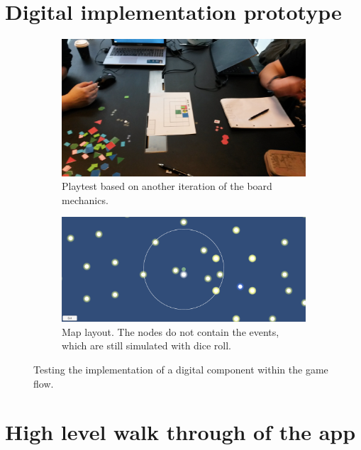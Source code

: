 \documentclass[a4paper,11pt]{report}
\begin{document}
\chapter{Digital implementation prototype}
\begin{figure}[!ht]
   \centering
   \begin{subfigure}[b]{\textwidth}
       \includegraphics[width=\textwidth]{Images/proto2.jpg}
       \caption{Playtest based on another iteration of the board mechanics.}
       \label{fig:flowtest}
   \end{subfigure}
   \begin{subfigure}[b]{\textwidth}
       \includegraphics[width=\textwidth]{Images/proto2map.png}
       \caption{Map layout. The nodes do not contain the events, which are still simulated with dice roll.}
       \label{fig:flowmap}
   \end{subfigure}
   \caption{Testing the implementation of a digital component within the game flow.}
   \label{fig:gameflow}
\end{figure}

\chapter{High level walk through of the app}
\end{document}
